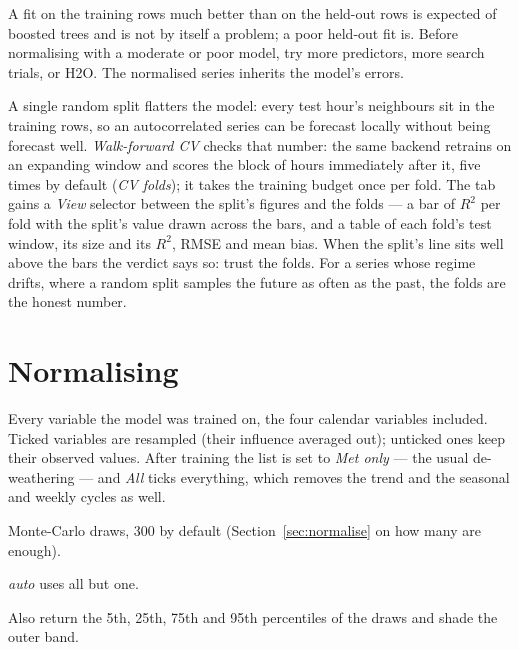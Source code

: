 \documentclass[11pt]{report}
\newcommand{\nosep}{\setlength{\itemsep}{0pt}\setlength{\parskip}{0pt}\setlength{\topsep}{2pt}}
\begin{document}
A fit on the training rows much better than on the held-out rows is expected of boosted
trees and is not by itself a problem; a poor held-out fit is. Before normalising with a
moderate or poor model, try more predictors, more search trials, or H2O. The
normalised series inherits the model's errors.

A single random split flatters the model: every test hour's neighbours sit in the
training rows, so an autocorrelated series can be forecast locally without being
forecast well. \emph{Walk-forward CV} checks that number: the same backend retrains on
an expanding window and scores the block of hours immediately after it, five times by
default (\emph{CV folds}); it takes the training budget once per fold. The tab gains a
\emph{View} selector between the split's figures and the folds --- a bar of $R^2$ per
fold with the split's value drawn across the bars, and a table of each fold's test
window, its size and its $R^2$, RMSE and mean bias. When the split's line sits well
above the bars the verdict says so: trust the folds. For a series whose regime drifts,
where a random split samples the future as often as the past, the folds are the honest
number.

\chapter{Normalising}\label{ch:normalise}

\begin{description}\nosep
  \item[Resample vars] Every variable the model was trained on, the four calendar
        variables included. Ticked variables are resampled (their influence averaged
        out); unticked ones keep their observed values. After training the list is set
        to \emph{Met only} --- the usual de-weathering --- and \emph{All} ticks
        everything, which removes the trend and the seasonal and weekly cycles as well.
  \item[Samples] Monte-Carlo draws, 300 by default (Section~\ref{sec:normalise} on how
        many are enough).
  \item[CPU cores] \emph{auto} uses all but one.
  \item[5--95\,\% quantile band] Also return the 5th, 25th, 75th and 95th percentiles of
        the draws and shade the outer band.
\end{description}
\end{document}

